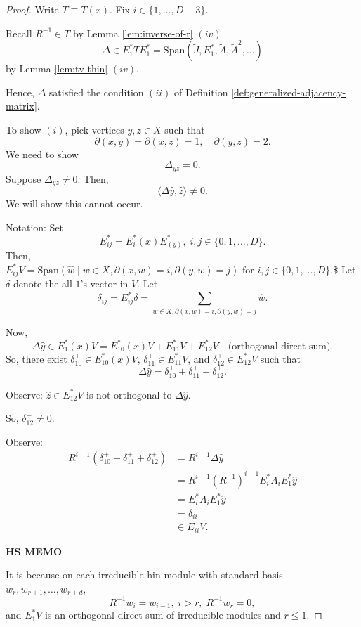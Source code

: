 \documentclass[
]{book}
\theoremstyle{definition}
\theoremstyle{definition}
\theoremstyle{definition}
\theoremstyle{definition}
\theoremstyle{remark}
\begin{document}
\begin{proof}
Write \(T \equiv T(x)\). Fix \(i\in \{1, \ldots, D-3\}\).

Recall \(R^{-1}\in T\) by Lemma \ref{lem:inverse-of-r} \((iv)\).
\[\Delta \in E^*_1TE^*_1 = \mathrm{Span}(\tilde{J}, E^*_1, \tilde{A}, \tilde{A}^2, \ldots)\]
by Lemma \ref{lem:tv-thin} \((iv)\).

Hence, \(\Delta\) satisfied the condition \((ii)\) of Definition \ref{def:generalized-adjacency-matrix}.

To show \((i)\), pick vertices \(y,z\in X\) such that
\[\partial(x,y) = \partial(x,z) = 1, \quad \partial(y,z) = 2.\]
We need to show
\[\Delta_{yz} = 0.\]
Suppose \(\Delta_{yz}\neq 0\). Then,
\[\langle \Delta\hat{y},\hat{z}\rangle \neq 0.\]
We will show this cannot occur.

Notation: Set
\[E^*_{ij} = E^*_i(x)E^*_(y), \; i,j\in \{0, 1, \ldots, D\}.\]
Then,
\(E^*_{ij}V = \mathrm{Span}(\hat{w}\mid w\in X, \partial(x,w)=i, \partial(y,w)=j) \text{ for } i,j\in \{0, 1, \ldots, D\}.\)\$
Let \(\delta\) denote the all \(1\)'s vector in \(V\). Let
\[\delta_{ij} = E^*_{ij}\delta = \sum_{w\in X, \partial(x,w)=i, \partial(y,w)=j}\hat{w}.\]

Now,
\[\Delta\hat{y} \in E^*_1(x)V = E^*_{10}(x)V + E^*_{11}V + E^*_{12}V \quad \text{(orthogonal direct sum)}.\]
So, there exist \(\delta^+_{10}\in E^*_{10}(x)V\), \(\delta^+_{11}\in E^*_{11}V\), and \(\delta^+_{12}\in E^*_{12}V\) such that
\[\Delta \hat{y} = \delta^+_{10} + \delta^+_{11} + \delta^+_{12}.\]

Observe: \(\hat{z}\in E^*_{12}V\) is not orthogonal to \(\Delta \hat{y}\).

So, \(\delta^+_{12}\neq 0\).

Observe:
\begin{align}
R^{i-1}(\delta^+_{10} + \delta^+_{11} + \delta^+_{12}) & = R^{i-1}\Delta\hat{y}\\
& = R^{i-1}(R^{-1})^{i-1}E^*_iA_iE^*_1\hat{y}\\
& = E^*_iA_iE^*_1\hat{y}\\
& = \delta_{ii}\\
& \in E_{ii}V.
\end{align}

\textbf{HS MEMO}

It is because on each irreducible hin module with standard basis \(w_r, w_{r+1}, \ldots, w_{r+d}\),
\[R^{-1}w_i = w_{i-1}, \; i>r, \; R^{-1}w_r = 0,\]
and \(E^*_1V\) is an orthogonal direct sum of irreducible modules and \(r\leq 1\).


\end{proof}
\end{document}

